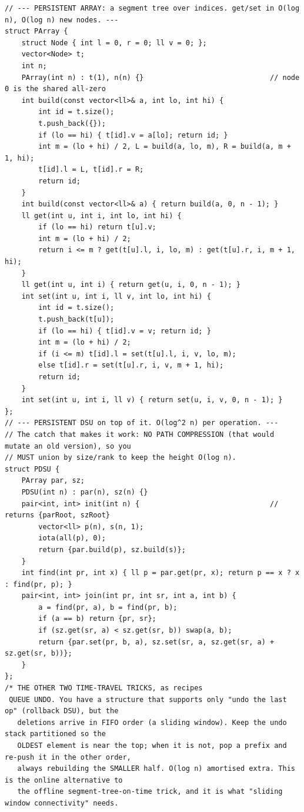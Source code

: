 \documentclass[9pt,a4paper,twocolumn]{extarticle}
\begin{document}
\begin{lstlisting}
// --- PERSISTENT ARRAY: a segment tree over indices. get/set in O(log n), O(log n) new nodes. ---
struct PArray {
    struct Node { int l = 0, r = 0; ll v = 0; };
    vector<Node> t;
    int n;
    PArray(int n) : t(1), n(n) {}                              // node 0 is the shared all-zero
    int build(const vector<ll>& a, int lo, int hi) {
        int id = t.size();
        t.push_back({});
        if (lo == hi) { t[id].v = a[lo]; return id; }
        int m = (lo + hi) / 2, L = build(a, lo, m), R = build(a, m + 1, hi);
        t[id].l = L, t[id].r = R;
        return id;
    }
    int build(const vector<ll>& a) { return build(a, 0, n - 1); }
    ll get(int u, int i, int lo, int hi) {
        if (lo == hi) return t[u].v;
        int m = (lo + hi) / 2;
        return i <= m ? get(t[u].l, i, lo, m) : get(t[u].r, i, m + 1, hi);
    }
    ll get(int u, int i) { return get(u, i, 0, n - 1); }
    int set(int u, int i, ll v, int lo, int hi) {
        int id = t.size();
        t.push_back(t[u]);
        if (lo == hi) { t[id].v = v; return id; }
        int m = (lo + hi) / 2;
        if (i <= m) t[id].l = set(t[u].l, i, v, lo, m);
        else t[id].r = set(t[u].r, i, v, m + 1, hi);
        return id;
    }
    int set(int u, int i, ll v) { return set(u, i, v, 0, n - 1); }
};
// --- PERSISTENT DSU on top of it. O(log^2 n) per operation. ---
// The catch that makes it work: NO PATH COMPRESSION (that would mutate an old version), so you
// MUST union by size/rank to keep the height O(log n).
struct PDSU {
    PArray par, sz;
    PDSU(int n) : par(n), sz(n) {}
    pair<int, int> init(int n) {                               // returns {parRoot, szRoot}
        vector<ll> p(n), s(n, 1);
        iota(all(p), 0);
        return {par.build(p), sz.build(s)};
    }
    int find(int pr, int x) { ll p = par.get(pr, x); return p == x ? x : find(pr, p); }
    pair<int, int> join(int pr, int sr, int a, int b) {
        a = find(pr, a), b = find(pr, b);
        if (a == b) return {pr, sr};
        if (sz.get(sr, a) < sz.get(sr, b)) swap(a, b);
        return {par.set(pr, b, a), sz.set(sr, a, sz.get(sr, a) + sz.get(sr, b))};
    }
};
/* THE OTHER TWO TIME-TRAVEL TRICKS, as recipes
 QUEUE UNDO. You have a structure that supports only "undo the last op" (rollback DSU), but the
   deletions arrive in FIFO order (a sliding window). Keep the undo stack partitioned so the
   OLDEST element is near the top; when it is not, pop a prefix and re-push it in the other order,
   always rebuilding the SMALLER half. O(log n) amortised extra. This is the online alternative to
   the offline segment-tree-on-time trick, and it is what "sliding window connectivity" needs.

\end{lstlisting}
\end{document}

